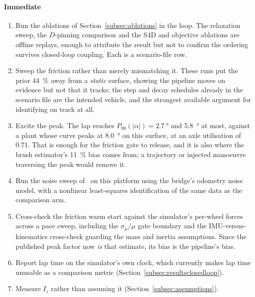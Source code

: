 \paragraph{Immediate}
\begin{enumerate}
\item Run the ablations of Section~\ref{subsec:ablations} in the loop. The
relaxation sweep, the $D$-pinning comparison and the S4D and objective
ablations are offline replays, enough to attribute the result but not to
confirm the ordering survives closed-loop coupling. Each is a scenario-file
row.
\item Sweep the friction rather than merely mismatching it. These runs put the
prior \SI{44}{\percent} away from a \emph{static} surface, showing the pipeline
moves on evidence but not that it tracks; the step and decay schedules already
in the scenario file are the intended vehicle, and the strongest available
argument for identifying on track at all.
\item Excite the peak. The lap reaches
$P_{99}(|\alpha|)=\SI{2.7}{\degree}$ and \SI{5.8}{\degree} at most, against a
plant whose curve peaks at \SI{8.0}{\degree} on this surface, at an axle
utilisation of \num{0.71}. That is enough for the friction gate to release, and
it is also where the brush estimator's \SI{11}{\percent} bias comes from; a
trajectory or injected manoeuvre traversing the peak would remove it.
\item Run the noise sweep of~\cite{ontrack2025} on this platform using the
bridge's odometry noise model, with a nonlinear least-squares identification of
the same data as the comparison arm.
\item Cross-check the friction warm start against the simulator's per-wheel
forces across a pace sweep, including the $\sigma_{\mu}/\mu$ gate boundary and
the IMU-versus-kinematics cross-check guarding the mass and inertia
assumptions. Since the published peak factor now \emph{is} that estimate, its
bias is the pipeline's bias.
\item Report lap time on the simulator's own clock, which currently makes lap
time unusable as a comparison metric
(Section~\ref{subsec:resultsclosedloop}).
\item Measure $I_{z}$ rather than assuming it
(Section~\ref{subsec:assumptions}).
\end{enumerate}

